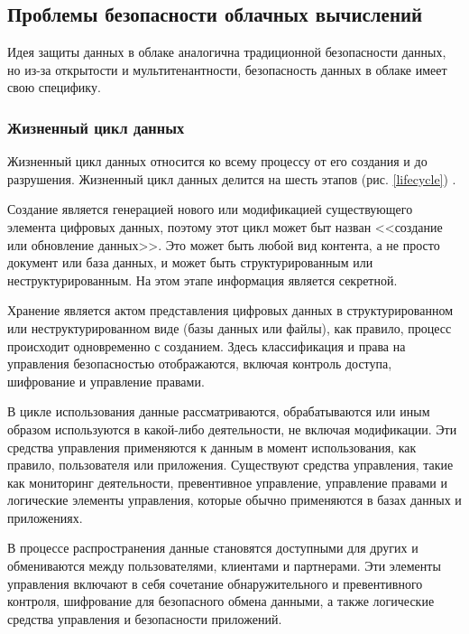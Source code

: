 \subsection{Проблемы безопасности облачных вычислений}

Идея защиты данных в облаке аналогична традиционной безопасности данных, но из-за открытости и мультитенантности, безопасность данных в облаке имеет свою специфику.

\subsubsection{Жизненный цикл данных}

Жизненный цикл данных относится ко всему процессу от его создания и до разрушения.
Жизненный цикл данных делится на шесть этапов (рис. \ref{lifecycle}) \cite{ls}.


Создание является генерацией нового или модификацией существующего элемента цифровых данных, поэтому этот цикл может быт назван <<создание или обновление данных>>.
Это может быть любой вид контента, а не просто документ или база данных, и может быть структурированным или неструктурированным.
На этом этапе информация является секретной.

Хранение является актом представления цифровых данных в структурированном или неструктурированном виде (базы данных или файлы), как правило, процесс происходит одновременно с созданием.
Здесь классификация и права на управления безопасностью отображаются, включая контроль доступа, шифрование и управление правами.

В цикле использования данные рассматриваются, обрабатываются или иным образом используются в какой-либо деятельности, не включая модификации.
Эти средства управления применяются к данным в момент использования, как правило, пользователя или приложения.
Существуют средства управления, такие как мониторинг деятельности, превентивное управление, управление правами и логические элементы управления, которые обычно применяются в базах данных и приложениях.

В процессе распространения данные становятся доступными для других и обмениваются между пользователями, клиентами и партнерами.
Эти элементы управления включают в себя сочетание обнаружительного и превентивного контроля, шифрование для безопасного обмена данными, а также логические средства управления и безопасности приложений.

